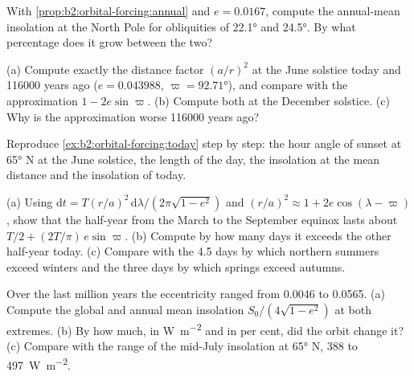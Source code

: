 \begin{exercise}[$\star$]\label{exo:b2:orbital-forcing:4}
With \cref{prop:b2:orbital-forcing:annual} and $e = 0.0167$, compute the annual-mean insolation at
the North Pole for obliquities of \ang{22.1} and \ang{24.5}. By what percentage does it grow between
the two?
\end{exercise}

\begin{exercise}[$\star\star$]\label{exo:b2:orbital-forcing:5}
(a) Compute exactly the distance factor $(a/r)^2$ at the June solstice today and \num{116000} years
ago ($e = 0.043988$, $\varpi = \ang{92.71}$), and compare with the approximation $1 -
2e\sin\varpi$. (b) Compute both at the December solstice. (c) Why is the approximation worse \num{116000}
years ago?
\end{exercise}

\begin{exercise}[$\star\star$]\label{exo:b2:orbital-forcing:6}
Reproduce \cref{ex:b2:orbital-forcing:today} step by step: the hour angle of sunset at \ang{65} N
at the June solstice, the length of the day, the insolation at the mean distance and the
insolation of today.
\end{exercise}

\begin{exercise}[$\star\star$]\label{exo:b2:orbital-forcing:7}
(a) Using $\mathrm dt = T(r/a)^2\,\mathrm d\lambda/(2\pi\sqrt{1 - e^2})$ and $(r/a)^2 \approx 1 +
2e\cos(\lambda - \varpi)$, show that the half-year from the March to the September equinox lasts
about $T/2 + (2T/\pi)\,e\sin\varpi$. (b) Compute by how many days it exceeds the other half-year
today. (c) Compare with the 4.5 days by which northern summers exceed winters and the three days by
which springs exceed autumns.
\end{exercise}

\begin{exercise}[$\star\star$]\label{exo:b2:orbital-forcing:8}
Over the last million years the eccentricity ranged from \num{0.0046} to \num{0.0565}. (a) Compute
the global and annual mean insolation $S_0/(4\sqrt{1 - e^2})$ at both extremes. (b) By how much, in
\unit{W.m^{-2}} and in per cent, did the orbit change it? (c) Compare with the range of the
mid-July insolation at \ang{65} N, 388 to \qty{497}{W.m^{-2}}.
\end{exercise}

